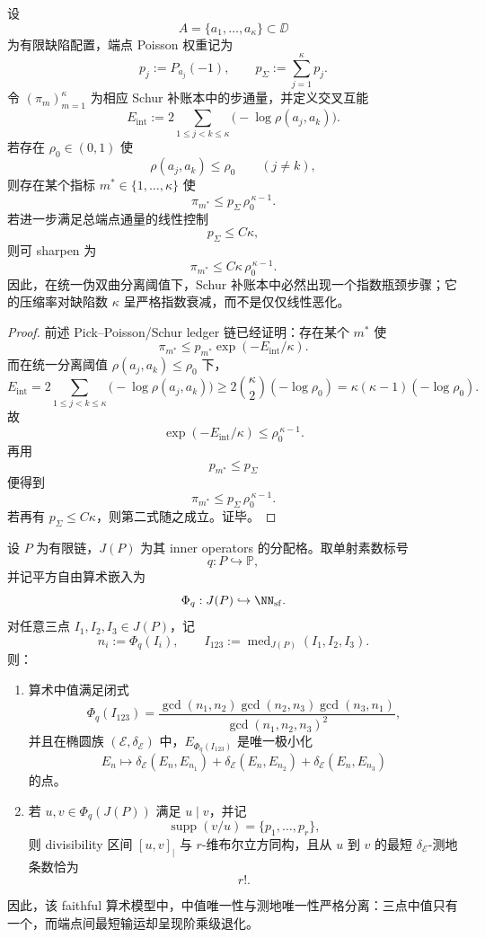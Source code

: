 \begin{theorem}\label{thm:conclusion-schur-ledger-uniform-separation-exponential-bottleneck}
设
\[
A=\{a_1,\dots,a_\kappa\}\subset \DD
\]
为有限缺陷配置，端点 Poisson 权重记为
\[
p_j:=P_{a_j}(-1),
\qquad
p_\Sigma:=\sum_{j=1}^{\kappa}p_j.
\]
令 \((\pi_m)_{m=1}^{\kappa}\) 为相应 Schur 补账本中的步通量，并定义交叉互能
\[
E_{\mathrm{int}}
:=
2\sum_{1\le j<k\le \kappa}\bigl(-\log \rho(a_j,a_k)\bigr).
\]
若存在 \(\rho_0\in(0,1)\) 使
\[
\rho(a_j,a_k)\le \rho_0
\qquad (j\neq k),
\]
则存在某个指标 \(m^\ast\in\{1,\dots,\kappa\}\) 使
\[
\pi_{m^\ast}\le p_\Sigma\,\rho_0^{\,\kappa-1}.
\]
若进一步满足总端点通量的线性控制
\[
p_\Sigma\le C\kappa,
\]
则可 sharpen 为
\[
\pi_{m^\ast}\le C\kappa\,\rho_0^{\,\kappa-1}.
\]
因此，在统一伪双曲分离阈值下，Schur 补账本中必然出现一个指数瓶颈步骤；它的压缩率对缺陷数 \(\kappa\) 呈严格指数衰减，而不是仅仅线性恶化。
\end{theorem}

\begin{proof}
前述 Pick--Poisson/Schur ledger 链已经证明：存在某个 \(m^\ast\) 使
\[
\pi_{m^\ast}\le p_{m^\ast}\exp(-E_{\mathrm{int}}/\kappa).
\]
而在统一分离阈值 \(\rho(a_j,a_k)\le \rho_0\) 下，
\[
E_{\mathrm{int}}
=
2\sum_{1\le j<k\le \kappa}\bigl(-\log \rho(a_j,a_k)\bigr)
\ge
2\binom{\kappa}{2}(-\log \rho_0)
=
\kappa(\kappa-1)(-\log \rho_0).
\]
故
\[
\exp(-E_{\mathrm{int}}/\kappa)\le \rho_0^{\,\kappa-1}.
\]
再用
\[
p_{m^\ast}\le p_\Sigma
\]
便得到
\[
\pi_{m^\ast}\le p_\Sigma\,\rho_0^{\,\kappa-1}.
\]
若再有 \(p_\Sigma\le C\kappa\)，则第二式随之成立。证毕。
\end{proof}

\begin{theorem}[算术中值的唯一极小性与测地退化的阶乘律]\label{thm:conclusion-chain-arithmetic-median-factorial-geodesics}
设 \(P\) 为有限链，\(J(P)\) 为其 inner operators 的分配格。取单射素数标号
\[
q:P\hookrightarrow\mathbb P,
\]
并记平方自由算术嵌入为
\[
\Phi_q:J(P)\hookrightarrow \NN_{\mathrm{sf}}.
\]
对任意三点 \(I_1,I_2,I_3\in J(P)\)，记
\[
n_i:=\Phi_q(I_i),
\qquad
I_{123}:=\operatorname{med}_{J(P)}(I_1,I_2,I_3).
\]
则：
\begin{enumerate}
  \item 算术中值满足闭式
  \[
  \Phi_q(I_{123})
  =
  \frac{\gcd(n_1,n_2)\gcd(n_2,n_3)\gcd(n_3,n_1)}
  {\gcd(n_1,n_2,n_3)^2},
  \]
  并且在椭圆族 \((\mathcal E,\delta_{\mathcal E})\) 中，\(E_{\Phi_q(I_{123})}\) 是唯一极小化
  \[
  E_n\longmapsto
  \delta_{\mathcal E}(E_n,E_{n_1})
  +\delta_{\mathcal E}(E_n,E_{n_2})
  +\delta_{\mathcal E}(E_n,E_{n_3})
  \]
  的点。
  \item 若 \(u,v\in \Phi_q(J(P))\) 满足 \(u\mid v\)，并记
  \[
  \operatorname{supp}(v/u)=\{p_1,\dots,p_r\},
  \]
  则 divisibility 区间 \([u,v]_{\mid}\) 与 \(r\)-维布尔立方同构，且从 \(u\) 到 \(v\) 的最短 \(\delta_{\mathcal E}\)-测地条数恰为
  \[
  r!.
  \]
\end{enumerate}
因此，该 faithful 算术模型中，中值唯一性与测地唯一性严格分离：三点中值只有一个，而端点间最短输运却呈现阶乘级退化。
\end{theorem}

